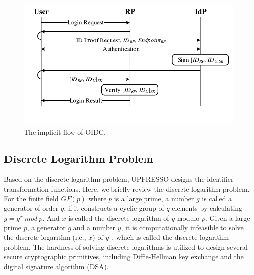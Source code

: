 \begin{figure}[t]
  \centering
  \includegraphics[width=0.95\linewidth]{fig/OIDC1.pdf}
  \caption{The implicit flow of OIDC.}
  \label{fig:OpenID}
\end{figure}

\subsection{Discrete Logarithm Problem}
\label{sec:dlp}

Based on the discrete logarithm problem, UPPRESSO designs the identifier-transformation functions. %
Here, we briefly review the discrete logarithm problem.
For the finite field $GF(p)$ where $p$ is a large prime, a number $g$ is called a generator of order $q$, if it constructs a cyclic  group of $q$ elements by calculating $y=g^x \ mod\ p$.
And $x$ is called the discrete logarithm of $y$ modulo $p$. Given a large prime $p$, a generator $g$ and a number $y$, it is computationally infeasible to solve the discrete logarithm (i.e., $x$) of $y$~\cite{WXWM}, which is called the discrete logarithm problem.
The hardness of solving discrete logarithms is utilized to design several secure cryptographic primitives, including Diffie-Hellman key exchange and the digital signature algorithm (DSA).

